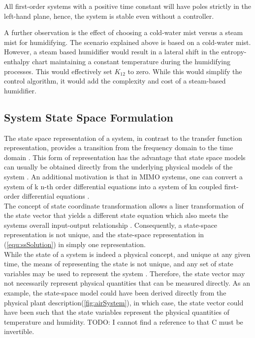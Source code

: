 \documentclass[a4paper, titlepage]{article}
\begin{document}
All first-order systems with a positive time constant will have poles strictly in the left-hand plane, hence, the system is stable even without a controller.
 
A further observation is the effect of choosing a cold-water mist versus a steam mist for humidifying.  The scenario explained above is based on a cold-water mist.  However, a steam based humidifier would result in a lateral shift in the entropy-enthalpy chart maintaining a constant temperature during the humidifying processes.  This would effectively set $K_{12}$ to zero.  While this would simplify the control algorithm, it would add the complexity and cost of a steam-based humidifier.\\   

\subsection{System State Space Formulation}
   
The state space representation of a system, in contrast to the transfer function representation, provides a transition from the frequency domain to the time domain \citep [p. 3]{williams07}.  This form of representation has the advantage that state space models can usually be obtained directly from the underlying physical models of the system \citep[p.~32]{glad00}.  An additional motivation is that in MIMO systems, one can convert a system of k n-th order differential equations into a system of kn coupled first-order differential equations \citep[p.~5]{williams07}.\\

The concept of state coordinate transformation allows a liner transformation of the state vector that yields a different state equation which also meets the systems overall input-output relationship \citep[p.~72]{williams07}.  Consequently, a state-space representation is not unique, and the state-space representation in (\ref{equ:ssSolution}) in simply one representation.\\

While the state of a system is indeed a physical concept, and unique at any given time, the means of representing the state is not unique, and any set of state variables may be used to represent the system \cite [p. 43]{melsa69}.  Therefore, the state vector may not necessarily represent physical quantities that can be measured directly. As an example, the state-space model could have been derived directly from the physical plant description(\ref{fig:airSystem}), in which case, the state vector could have been such that the state variables represent the physical quantities of temperature and humidity. 
TODO: I cannot find a reference to that C must be invertible.\\
\end{document}
